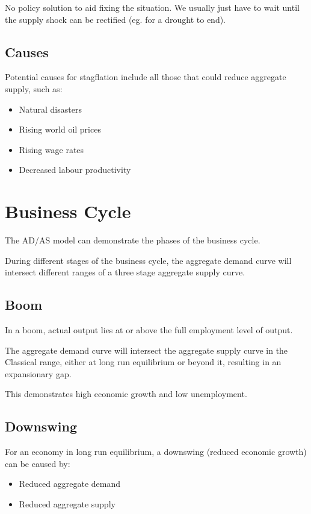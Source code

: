 \documentclass[a4paper,11pt]{report}
\begin{document}
No policy solution to aid fixing the situation. We usually just have to wait
until the supply shock can be rectified (eg. for a drought to end).

\subsection{Causes}

Potential causes for stagflation include all those that could reduce aggregate
supply, such as:

\begin{itemize}
\item Natural disasters
\item Rising world oil prices
\item Rising wage rates
\item Decreased labour productivity
\end{itemize}


\section{Business Cycle}

The AD/AS model can demonstrate the phases of the business cycle.

During different stages of the business cycle, the aggregate demand curve will
intersect different ranges of a three stage aggregate supply curve.

\subsection{Boom}

In a boom, actual output lies at or above the full employment level of output.

The aggregate demand curve will intersect the aggregate supply curve in the
Classical range, either at long run equilibrium or beyond it, resulting in an
expansionary gap.

This demonstrates high economic growth and low unemployment.

\subsection{Downswing}

For an economy in long run equilibrium, a downswing (reduced economic growth)
can be caused by:

\begin{itemize}
\item Reduced aggregate demand
\item Reduced aggregate supply
\end{itemize}
\end{document}
